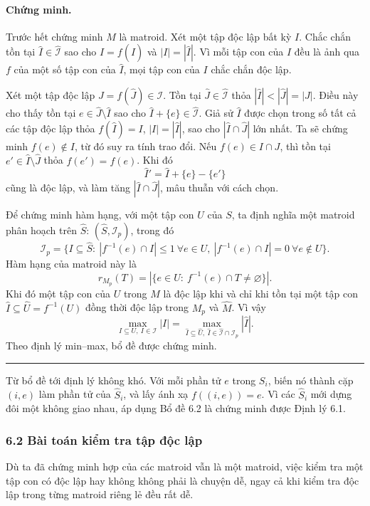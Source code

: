 \documentclass[11pt]{article}
\newcommand{\qedmark}{\hfill\rule{0.7ex}{0.7ex}}
\begin{document}
\paragraph{Chứng minh.}
Trước hết chứng minh \(M\) là matroid. Xét một tập độc lập bất kỳ \(I\). Chắc
chắn tồn tại \(\hat I\in\hat{\mathcal I}\) sao cho \(I=f(\hat I)\) và
\(|I|=|\hat I|\). Vì mỗi tập con của \(I\) đều là ảnh qua \(f\) của một số tập
con của \(\hat I\), mọi tập con của \(I\) chắc chắn độc lập.

Xét một tập độc lập \(J=f(\hat J)\in\mathcal I\). Tồn tại
\(\hat J\in\hat{\mathcal I}\) thỏa \(|\hat I|<|\hat J|=|J|\). Điều này cho thấy
tồn tại \(e\in\hat J\setminus\hat I\) sao cho \(\hat I+\{e\}\in\hat{\mathcal I}\).
Giả sử \(\hat I\) được chọn trong số tất cả các tập độc lập thỏa
\(f(\hat I)=I\), \(|I|=|\hat I|\), sao cho \(|\hat I\cap\hat J|\) lớn nhất. Ta sẽ
chứng minh \(f(e)\notin I\), từ đó suy ra tính trao đổi. Nếu
\(f(e)\in I\cap J\), thì tồn tại \(e'\in\hat I\setminus\hat J\) thỏa
\(f(e')=f(e)\). Khi đó
\[
  \hat I'=\hat I+\{e\}-\{e'\}
\]
cũng là độc lập, và làm tăng \(|\hat I\cap\hat J|\), mâu thuẫn với cách chọn.

Để chứng minh hàm hạng, với một tập con \(U\) của \(S\), ta định nghĩa một
matroid phân hoạch trên \(\hat S\): \((\hat S,\mathcal I_p)\), trong đó
\[
  \mathcal I_p=\{I\subseteq\hat S:\ |f^{-1}(e)\cap I|\le 1\ \forall e\in U,
  \ |f^{-1}(e)\cap I|=0\ \forall e\notin U\}.
\]
Hàm hạng của matroid này là
\[
  r_{M_p}(T)=|\{e\in U:\ f^{-1}(e)\cap T\ne\varnothing\}|.
\]
Khi đó một tập con của \(U\) trong \(M\) là độc lập khi và chỉ khi tồn tại một
tập con \(\hat I\subseteq \hat U=f^{-1}(U)\) đồng thời độc lập trong
\(M_p\) và \(\hat M\). Vì vậy
\[
  \max_{I\subseteq U,\ I\in\mathcal I}|I|
  =
  \max_{\hat I\subseteq\hat U,\ \hat I\in\hat{\mathcal I}\cap\mathcal I_p}
  |\hat I|.
\]
Theo định lý min--max, bổ đề được chứng minh. \qedmark

Từ bổ đề tới định lý không khó. Với mỗi phần tử \(e\) trong \(S_i\), biến nó
thành cặp \((i,e)\) làm phần tử của \(\hat S_i\), và lấy ánh xạ
\(f((i,e))=e\). Vì các \(\hat S_i\) mới dựng đôi một không giao nhau, áp dụng Bổ
đề 6.2 là chứng minh được Định lý 6.1.

\subsubsection*{6.2 Bài toán kiểm tra tập độc lập}

Dù ta đã chứng minh hợp của các matroid vẫn là một matroid, việc kiểm tra một
tập con có độc lập hay không không phải là chuyện dễ, ngay cả khi kiểm tra độc
lập trong từng matroid riêng lẻ đều rất dễ.
\end{document}
